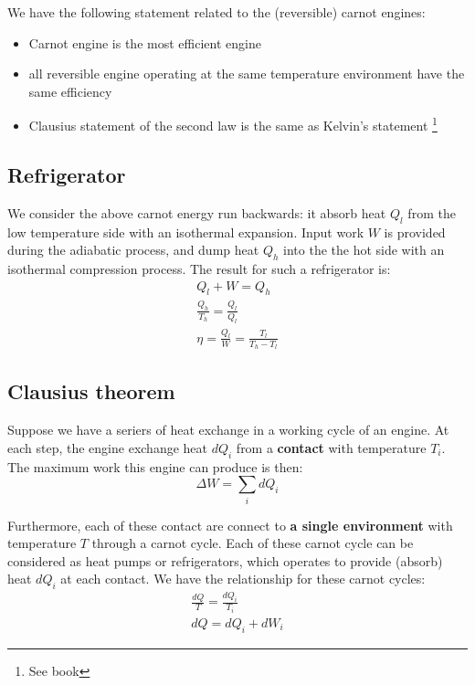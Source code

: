\documentclass{article}
\newcommand{\dbar}{d}
\begin{document}
We have the following statement related to the (reversible) carnot engines:
\begin{itemize}
    \item Carnot engine is the most efficient engine
    \item all reversible engine operating at the same temperature environment have the same efficiency
    \item Clausius statement of the second law is the same as Kelvin's statement \footnote{See book}
\end{itemize}

\subsection*{Refrigerator}
We consider the above carnot energy run backwards: it absorb heat $Q_l$ from the 
low temperature side with an isothermal expansion. Input work $W$ is provided 
during the adiabatic process, and dump heat $Q_h$ into the the hot side 
with an isothermal compression process. The result for such a refrigerator is:
\begin{gather}
    Q_l + W = Q_h \\
    \frac{Q_h}{T_h} = \frac{Q_l}{Q_l} \\
    \eta = \frac{Q_l}{W} = \frac{T_l}{T_h - T_l}
\end{gather} 

\subsection*{Clausius theorem}
Suppose we have a seriers of heat exchange in a working cycle of an engine. At 
each step, the engine exchange heat $\dbar Q_i $ from a \textbf{contact} with 
temperature $T_i$. The maximum work this engine can produce is then:
\begin{equation}
    \Delta W = \sum_i \dbar Q_i
\end{equation}

Furthermore, each of these contact are connect to \textbf{a single environment} 
with temperature $T$ through a carnot cycle. Each of these carnot cycle can be considered
as heat pumps or refrigerators, which operates to provide (absorb) heat $\dbar Q_i $
at each contact.
We have the relationship for these carnot cycles:
\begin{gather}
    \frac{\dbar Q}{T} = \frac{\dbar Q_i}{T_i} \\
    \dbar Q = \dbar Q_i + \dbar W_i 
\end{gather}
\end{document}
